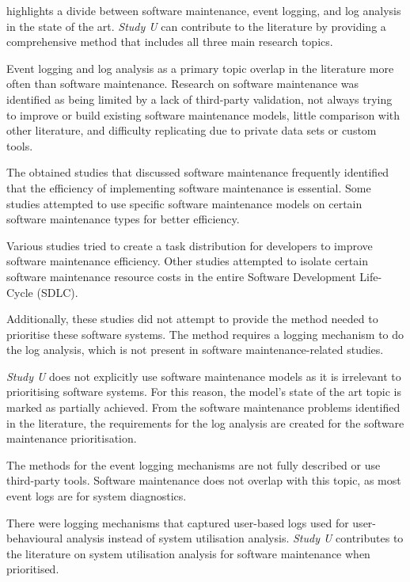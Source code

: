  highlights a divide between software maintenance, event logging, and log analysis in the state of the art. \textit{Study U} can contribute to the literature by providing a comprehensive method that includes all three main research topics. \par Event logging and log analysis as a primary topic overlap in the literature more often than software maintenance. Research on software maintenance was identified as being limited by a lack of third-party validation, not always trying to improve or build existing software maintenance models, little comparison with other literature, and difficulty replicating due to private data sets or custom tools. \par The obtained studies that discussed software maintenance frequently identified that the efficiency of implementing software maintenance is essential. Some studies attempted to use specific software maintenance models on certain software maintenance types for better efficiency. \par Various studies tried to create a task distribution for developers to improve software maintenance efficiency. Other studies attempted to isolate certain software maintenance resource costs in the entire Software Development Life-Cycle (SDLC). \par Additionally, these studies did not attempt to provide the method needed to prioritise these software systems. The method requires a logging mechanism to do the log analysis, which is not present in software maintenance-related studies. \par \textit{Study U} does not explicitly use software maintenance models as it is irrelevant to prioritising software systems. For this reason, the model's state of the art topic is marked as partially achieved. From the software maintenance problems identified in the literature, the requirements for the log analysis are created for the software maintenance prioritisation. \par The methods for the event logging mechanisms are not fully described or use third-party tools. Software maintenance does not overlap with this topic, as most event logs are for system diagnostics. \par There were logging mechanisms that captured user-based logs used for user-behavioural analysis instead of system utilisation analysis. \textit{Study U} contributes to the literature on system utilisation analysis for software maintenance when prioritised.


